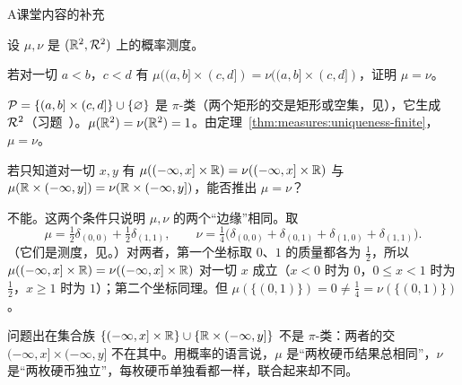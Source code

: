 \begin{exercises}{A}{课堂内容的补充}
\item\label{ex:measures:A9} 设 $\mu,\nu$ 是 $(\mathbb{R}^2,\mathcal{R}^2)$ 上的概率测度。
\begin{questions}
\item 若对一切 $a<b$，$c<d$ 有 $\mu((a,b]\times(c,d])=\nu((a,b]\times(c,d])$，证明 $\mu=\nu$。
\begin{solution}
$\mathcal{P}=\{(a,b]\times(c,d]\}\cup\{\varnothing\}$ 是 $\pi$-类（两个矩形的交是矩形或空集，见），它生成 $\mathcal{R}^2$（习题~）。$\mu(\mathbb{R}^2)=\nu(\mathbb{R}^2)=1$。由定理~\ref{thm:measures:uniqueness-finite}，$\mu=\nu$。
\end{solution}
\item 若只知道对一切 $x,y$ 有 $\mu((-\infty,x]\times\mathbb{R})=\nu((-\infty,x]\times\mathbb{R})$ 与 $\mu(\mathbb{R}\times(-\infty,y])=\nu(\mathbb{R}\times(-\infty,y])$，能否推出 $\mu=\nu$？
\begin{solution}
不能。这两个条件只说明 $\mu,\nu$ 的两个“边缘”相同。取
\[
\mu=\tfrac12\delta_{(0,0)}+\tfrac12\delta_{(1,1)},\qquad\nu=\tfrac14\bigl(\delta_{(0,0)}+\delta_{(0,1)}+\delta_{(1,0)}+\delta_{(1,1)}\bigr).
\]
（它们是测度，见。）对两者，第一个坐标取 $0$、$1$ 的质量都各为 $\frac12$，所以 $\mu((-\infty,x]\times\mathbb{R})=\nu((-\infty,x]\times\mathbb{R})$ 对一切 $x$ 成立（$x<0$ 时为 $0$，$0\leqslant x<1$ 时为 $\frac12$，$x\geqslant1$ 时为 $1$）；第二个坐标同理。但 $\mu(\{(0,1)\})=0\neq\frac14=\nu(\{(0,1)\})$。

问题出在集合族 $\{(-\infty,x]\times\mathbb{R}\}\cup\{\mathbb{R}\times(-\infty,y]\}$ 不是 $\pi$-类：两者的交 $(-\infty,x]\times(-\infty,y]$ 不在其中。用概率的语言说，$\mu$ 是“两枚硬币结果总相同”，$\nu$ 是“两枚硬币独立”，每枚硬币单独看都一样，联合起来却不同。
\end{solution}
\end{questions}
\end{exercises}

